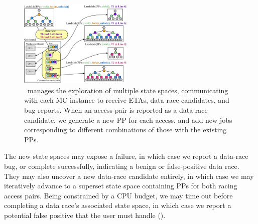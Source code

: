 \begin{figure}[t]
	\includegraphics[width=0.48\textwidth]{dr-jobs-v2.pdf}
	\caption{\quicksand~manages the exploration of multiple state spaces, communicating with each MC instance to receive ETAs, data race candidates, and bug reports.
		When an access pair is reported as a data race candidate, we generate a new PP for each access, and add new jobs corresponding to different combinations of those with the existing PPs.}
	\label{fig:new-dr-jobs}
\end{figure}

The new state spaces may expose a failure, in which case we report a data-race bug,
or complete successfully, indicating a benign or false-positive data race.
They may also uncover a new data-race candidate entirely, %
in which case we may iteratively advance to a superset state space containing PPs for both racing access pairs.
Being constrained by a CPU budget,
we may time out before completing a data race's associated state space,
in which case we report a potential false positive that the user must handle (\sect{\ref{sec:future}}).


